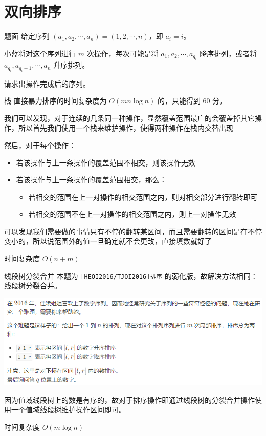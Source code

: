 \documentclass{pptt}
\begin{document}
\section{双向排序}

\begin{frame}{题面}
    给定序列 $(a_1,a_2,\cdots,a_n) = (1,2,\cdots,n)$，即 $a_i=i$。

    小蓝将对这个序列进行 $m$ 次操作，每次可能是将 $a_1,a_2,\cdots,a_{q_i}$ 降序排列，或者将 $a_{q_i},a_{q_i+1},\cdots,a_n$ 升序排列。

    请求出操作完成后的序列。
\end{frame}

\begin{frame}{栈}
    直接暴力排序的时间复杂度为 $O(mn\log{n})$ 的，只能得到 $60$ 分。

    我们可以发现，对于连续的几条同一种操作，显然覆盖范围最广的会覆盖掉其它操作，所以首先我们使用一个栈来维护操作，使得两种操作在栈内交替出现

    然后，对于每个操作：

    \begin{itemize}
        \item 若该操作与上一条操作的覆盖范围不相交，则该操作无效
        \item 若该操作与上一条操作的覆盖范围相交，那么：
              \begin{itemize}
                  \item 若相交的范围在上一对操作的相交范围之内，则对相交部分进行翻转即可
                  \item 若相交的范围不在上一对操作的相交范围之内，则上一对操作无效
              \end{itemize}
    \end{itemize}

    可以发现我们需要做的事情只有不停的翻转某区间，而且需要翻转的区间是在不停变小的，所以说范围外的值一旦确定就不会更改，直接填数就好了

    时间复杂度 $O(n+m)$
\end{frame}

\begin{frame}{线段树分裂合并}
    本题为 \texttt{[HEOI2016/TJOI2016]排序} 的弱化版，故解决方法相同：线段树分裂合并。

    \begin{center}
        \includegraphics[scale=0.4]{images/sort.png}
    \end{center}

    因为值域线段树上的数是有序的，故对于排序操作即通过线段树的分裂合并操作使用一个值域线段树维护操作区间即可。

    时间复杂度 $O(m\log{n})$
\end{frame}
\end{document}
